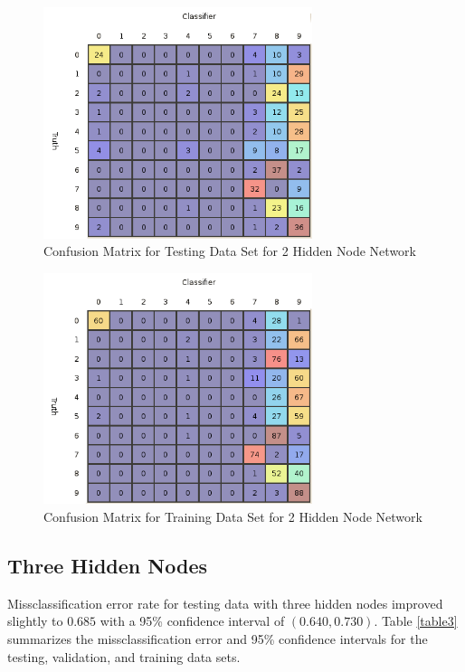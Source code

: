 \documentclass{article}
\begin{document}
\begin{figure}
\centering
\includegraphics[width=0.7\textwidth]{data/final/2_test_confusion.png}
\caption{Confusion Matrix for Testing Data Set for 2 Hidden Node Network}
\label{testconfusion2}
\end{figure}

\begin{figure}
\centering
\includegraphics[width=0.7\textwidth]{data/final/2_train_confusion.png}
\caption{Confusion Matrix for Training Data Set for 2 Hidden Node Network}
\label{trainconfusion2}
\end{figure}

\subsection{Three Hidden Nodes}\label{hidden3}

Missclassification error rate for testing data with three hidden nodes improved slightly to \(0.685\) with a 95\% confidence interval of \((0.640 , 0.730)\). Table \ref{table3} summarizes the missclassification error and 95\% confidence intervals for the testing, validation, and training data sets.
\end{document}
